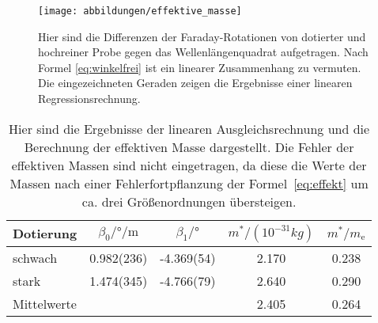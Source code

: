 \begin{figure}
  \centering
  \texttt{[image: abbildungen/effektive\_masse]}
  \caption{Hier sind die Differenzen der Faraday-Rotationen von
    dotierter und hochreiner Probe gegen das Wellenlängenquadrat
    aufgetragen.  Nach Formel \eqref{eq:winkelfrei} ist ein linearer
    Zusammenhang zu vermuten.  Die eingezeichneten Geraden zeigen die
    Ergebnisse einer linearen Regressionsrechnung.}
  \label{fig:linregress}
\end{figure}

\begin{table}
  \centering
  \begin{tabular}{lSSSS}
    \toprule
    {Dotierung} &
    {$\beta_0/\si{\degree\per\meter}$} &
    {$\beta_1/\si{\degree}$} &
    {$m^*/(10^{-31}\si{kg})$} &
    {$m^*/m_\text{e}$}
    \\
    \midrule
    schwach & 0.982(236) & -4.369(54) & 2.170 & 0.238 \\
    stark & 1.474(345) & -4.766(79) & 2.640 & 0.290 \\
    \midrule
    Mittelwerte & & & 2.405 & 0.264\\
    \bottomrule
  \end{tabular}
  \caption{Hier sind die Ergebnisse der linearen Ausgleichsrechnung und
    die Berechnung der effektiven Masse dargestellt. Die Fehler der 
    effektiven Massen sind nicht eingetragen, da diese die Werte der 
    Massen nach einer 
    Fehlerfortpflanzung der Formel~\eqref{eq:effekt} um ca. drei 
    Größenordnungen übersteigen.}
  \label{tab:linregress}
\end{table}
